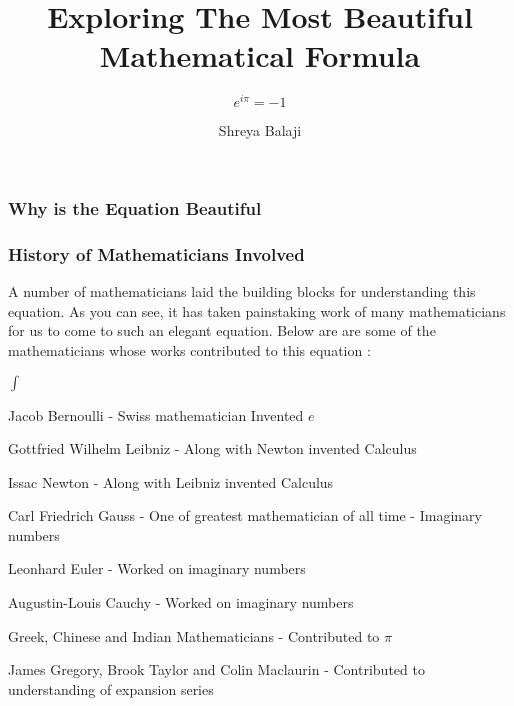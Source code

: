\documentclass[10pt]{beamer}
\begin{document}
\author{Shreya Balaji}
\title{Exploring The Most Beautiful Mathematical Formula}
\subtitle{\huge\(e^{i \pi} = -1\)}


\begin{frame}[plain]
	\maketitle
\end{frame}

\begin{frame}
	\frametitle{Why is the Equation Beautiful}
\end{frame}

\begin{frame}
	\frametitle{ History of Mathematicians Involved}

	A number of mathematicians laid the building blocks for understanding this equation.  As you can see, it has taken painstaking work of many mathematicians for us to come to such an elegant equation. Below are are some of the mathematicians whose works contributed to this equation :
	\vspace{7pt}

	\begin{list}{$\int$}{}
		\item Jacob Bernoulli - Swiss mathematician Invented $e$
		\item  Gottfried Wilhelm Leibniz  - Along with Newton invented Calculus
		\item Issac Newton - Along with Leibniz invented Calculus
		\item Carl Friedrich Gauss - One of  greatest mathematician of all time - Imaginary numbers
		\item Leonhard Euler - Worked on imaginary numbers
		\item Augustin-Louis Cauchy - Worked on imaginary numbers
		\item Greek, Chinese and Indian Mathematicians - Contributed to $\pi$
		\item James Gregory, Brook Taylor and Colin Maclaurin - Contributed to understanding of expansion series
	\end{list}

\end{frame}
\end{document}
